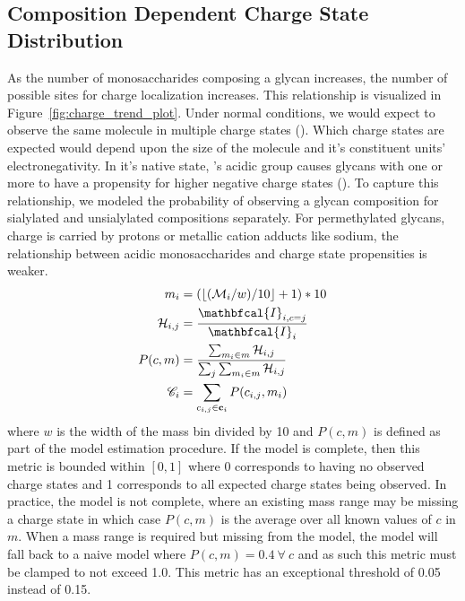     \subsection{Composition Dependent Charge State Distribution}
        As the number of monosaccharides composing a glycan increases, the number of possible sites
        for charge localization increases. This relationship is visualized in Figure~\ref{fig:charge_trend_plot}.
        Under normal conditions, we would expect to observe the same molecule in multiple charge states
        (\cite{Maxwell2012}). Which charge states are expected would depend upon the size of the molecule
        and it's constituent units' electronegativity. In it's native state, 's
        acidic group causes glycans with one or more  to have a propensity for
        higher negative charge states (\cite{Varki2009}). To capture this relationship, we modeled the
        probability of observing a glycan composition for sialylated and unsialylated compositions
        separately. For permethylated glycans, charge is carried by protons or metallic cation adducts
        like sodium, the relationship between acidic monosaccharides and charge state propensities is
        weaker.
        \begin{align}
            m_i &= (\floor*{(\mathcal{M}_i / w) / 10} + 1) * 10 \nonumber\\
            \mathcal{H}_{i,j} &= \frac{
                \mathbfcal{I}_{i, c=j}}{\mathbfcal{I}_i} \nonumber\\
            P(c, m) &= \frac{\sum_{m_i \in m} \mathcal{H}_{i, j}}{
                \sum_{j}{\sum_{m_i \in m} \mathcal{H}_{i, j}}} \nonumber\\
            \mathscr{C}_i &= \sum_{c_{i, j} \in \mathbf{c}_i}{P(c_{i, j}, m_i)}
        \end{align}
        where $w$ is the width of the mass bin divided by 10 and $P(c, m)$ is defined as
        part of the model estimation procedure. If the model is complete, then this metric is
        bounded within $[0, 1]$ where 0 corresponds to having no observed charge states and 1
        corresponds to all expected charge states being observed. In practice, the model is not
        complete, where an existing mass range may be missing a charge state in which case
        $P(c, m)$ is the average over all known values of $c$ in $m$. When a mass range is
        required but missing from the model, the model will fall back to a naive model where
        $P(c, m) = 0.4 \ \forall \ c$ and as such this metric must be clamped to not exceed
        1.0. This metric has an exceptional threshold of 0.05 instead of 0.15.

